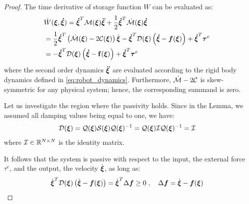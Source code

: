 \begin{proof}
The time derivative of storage function $W$ can be evaluated as:
\begin{align}
	& \dot W(\boldsymbol{\xi}, \boldsymbol{\dot \xi}) =
    \boldsymbol{\dot \xi}^T \mathcal{M}(\boldsymbol{\xi}) \boldsymbol{\ddot \xi}  + \frac{1}{2} \boldsymbol{\dot \xi}^T \dot{\mathcal{M}}(\boldsymbol{\xi}) \boldsymbol{\dot \xi}  \nonumber \\
  &= \frac{1}{2} \boldsymbol{\dot \xi}^T \left( \dot{\mathcal{M}}(\boldsymbol{\xi}) - 2 \mathcal{C}(\boldsymbol{\xi}) \right) \dot{\boldsymbol{\xi}} - \boldsymbol{\dot \xi}^T \mathcal{D}(\boldsymbol{\xi}) \left(\boldsymbol{\dot \xi} - \boldsymbol{f}(\boldsymbol{\xi}) \right) + \boldsymbol{\dot \xi}^T \boldsymbol{\tau}^e \nonumber \\
  &= - \boldsymbol{\dot \xi}^T \mathcal{D}(\boldsymbol{\xi}) \left( \boldsymbol{\dot\xi} - \mathbf{f}(\boldsymbol{\xi}) \right) + \boldsymbol{\dot\xi}^T \boldsymbol{\tau}^e
\end{align}
where the second order dynamics $\boldsymbol{\ddot \xi}$ are evaluated according to the rigid body dynamics defined in \eqref{eq:robot_dynamics}. Furthermore, $\dot{\mathcal{M}} - 2 \mathcal{C}$ is skew-symmetric for any physical system; hence, the corresponding summand is zero.

Let us investigate the region where the passivity holds. Since in the Lemma, we assumed all damping values being equal to one, we have:
\begin{equation}
	\mathcal{D}({\boldsymbol{\xi}}) = \mathcal{Q}({\boldsymbol{\xi}}) \mathcal{S} ({\boldsymbol{\xi}}) \mathcal{Q}({\boldsymbol{\xi}})^{-1}= \mathcal{Q}({\boldsymbol{\xi}}) \mathcal{I} \mathcal{Q}({\boldsymbol{\xi}})^{-1} = \mathcal{I}
\end{equation}
where $\mathcal{I} \in \mathbb{R}^{N \times N}$ is the identity matrix.

It follows that the system is passive with respect to the input, the external force $\tau^e$, and the output, the velocity $\dot {\boldsymbol{\xi}}$, as long as:
\begin{equation}
	\dot{\boldsymbol {\vecs \xi}}^T \matd{D}({\vecs \xi}) \left(\dot{\boldsymbol {\vecs \xi}} - \boldsymbol{f}(\boldsymbol {\vecs \xi}) \right) = 
    \dot{{\vecs \xi}} ^ T \Delta \vect{f}  \geq 0 
 \; , \quad
 \Delta \vect{f} = \dot{{\vecs \xi}} - \vect{f}({\vecs \xi})
 \label{eq:passivity_condition}
\end{equation}


\end{proof}
